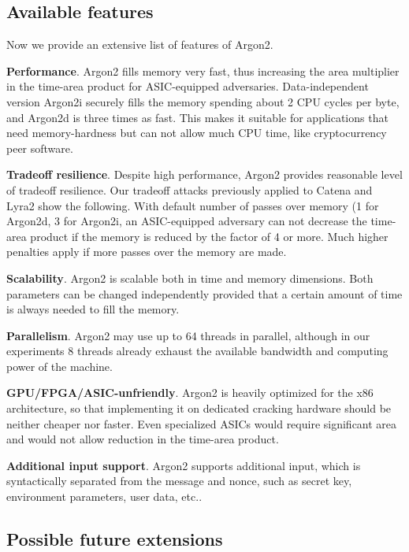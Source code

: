 \documentclass[a4paper]{article}
\begin{document}
\subsection{Available features}
Now we provide an extensive list of features of Argon2.

\textbf{Performance}. \textsf{Argon2} fills memory very fast, thus increasing the area multiplier in the time-area product for ASIC-equipped adversaries. Data-independent version \textsf{Argon2i} securely fills the memory spending about 2 CPU cycles per byte, and \textsf{Argon2d} is three times as fast. This makes it suitable for applications that need memory-hardness but can not allow much CPU time, like cryptocurrency peer software.

\textbf{Tradeoff resilience}.  Despite high performance, \textsf{Argon2} provides reasonable level of tradeoff resilience. Our tradeoff attacks previously applied to Catena and Lyra2 show the following. With default number of passes over memory (1 for \textsf{Argon2d}, 3 for \textsf{Argon2i}, an ASIC-equipped adversary can not decrease the time-area product if the memory is reduced by the factor of 4 or more. Much higher penalties apply if more passes over the memory are made. 

\textbf{Scalability}.  \textsf{Argon2} is scalable both in time and memory dimensions.  Both parameters can be changed independently provided that a certain amount of time is always needed to fill the memory. 

\textbf{Parallelism}. \textsf{Argon2}  may use up to 64 threads in parallel,  although in our experiments 8 threads already exhaust the available bandwidth and computing power of the machine.

\textbf{GPU/FPGA/ASIC-unfriendly}. \textsf{Argon2} is heavily optimized for the x86 architecture, so that implementing it on  dedicated cracking hardware should  be neither cheaper nor faster. Even specialized ASICs would require significant area and would not allow reduction in the time-area product.

\textbf{Additional input support}. \textsf{Argon2} supports additional input, which is syntactically separated from the message and nonce, such as secret key, environment parameters, user data, etc..


\subsection{Possible future extensions}\label{sec:future2}
\end{document}
